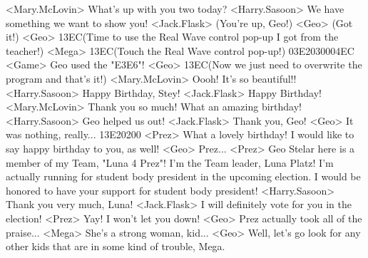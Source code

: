 <Mary.McLovin> What's up with you two today? 
<Harry.Sasoon> We have something we want to show you! 
<Jack.Flask> (You're up, Geo!) 
<Geo> (Got it!) 
<Geo> {13}{EC}(Time to use the Real  Wave control pop-up I  got from the teacher!) 
<Mega> {13}{EC}(Touch the Real Wave control  pop-up!) {03}{E2}{03}{00}{04}{EC} 
<Game> Geo used the "{E3}{E6}"! 
<Geo> {13}{EC}(Now we just need to  overwrite the program  and that's it!) 
<Mary.McLovin> Oooh! It's so beautiful!! 
<Harry.Sasoon> Happy Birthday, Stey! 
<Jack.Flask> Happy Birthday! 
<Mary.McLovin> Thank you so much! What an amazing birthday! 
<Harry.Sasoon> Geo helped us out! 
<Jack.Flask> Thank you, Geo! 
<Geo> It was nothing, really... 
{13}{E2}{02}{00} 
<Prez> What a lovely birthday! 
I would like to say happy birthday to you, as well! 
<Geo> Prez... 
<Prez> Geo Stelar here is a member of my Team, "Luna 4 Prez"! 
I'm the Team leader, Luna Platz! 
I'm actually running for student body president in the upcoming election. 
I would be honored to have your support for student body president! 
<Harry.Sasoon> Thank you very much, Luna! 
<Jack.Flask> I will definitely vote for you in the election! 
<Prez> Yay! I won't let you down! 
<Geo> Prez actually took all of the praise... 
<Mega> She's a strong woman, kid... 
<Geo> Well, let's go look for any other kids that are in some kind of trouble, Mega. 
